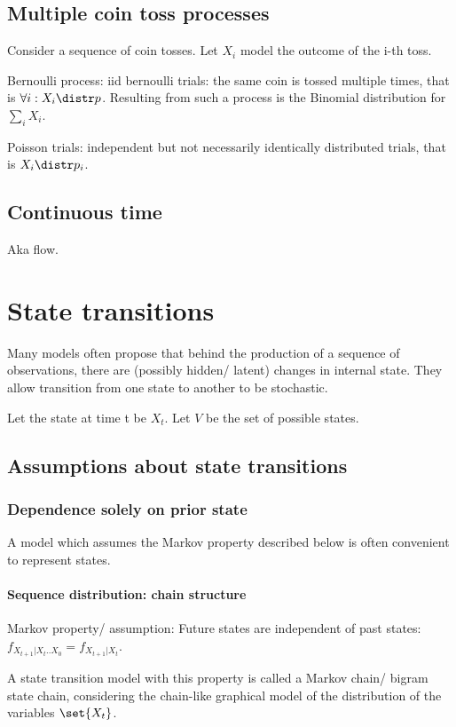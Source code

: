 \documentclass[oneside, article]{memoir}
\begin{document}
\subsection{Multiple coin toss processes}
Consider a sequence of coin tosses. Let $X_i$ model the outcome of the i-th toss.

Bernoulli process: iid bernoulli trials: the same coin is tossed multiple times, that is $\forall i: X_i \distr p$. Resulting from such a process is the Binomial distribution for $\sum_i X_i$.

Poisson trials: independent but not necessarily identically distributed trials, that is $X_i \distr p_i$.

\subsection{Continuous time}
Aka flow. \tbc

\section{State transitions}
Many models often propose that behind the production of a sequence of observations, there are (possibly hidden/ latent) changes in internal state. They allow transition from one state to another to be stochastic.

Let the state at time t be $X_{t}$. Let $V$ be the set of possible states.

\subsection{Assumptions about state transitions}
\subsubsection{Dependence solely on prior state}
A model which assumes the Markov property described below is often convenient to represent states.

\paragraph{Sequence distribution: chain structure}
Markov property/ assumption: Future states are independent of past states: $f_{X_{t+1}|X_{t} .. X_{0}} = f_{X_{t+1}|X_{t}}$.

A state transition model with this property is called a Markov chain/ bigram state chain, considering the chain-like graphical model of the distribution of the variables $\set{X_t}$.
\end{document}
